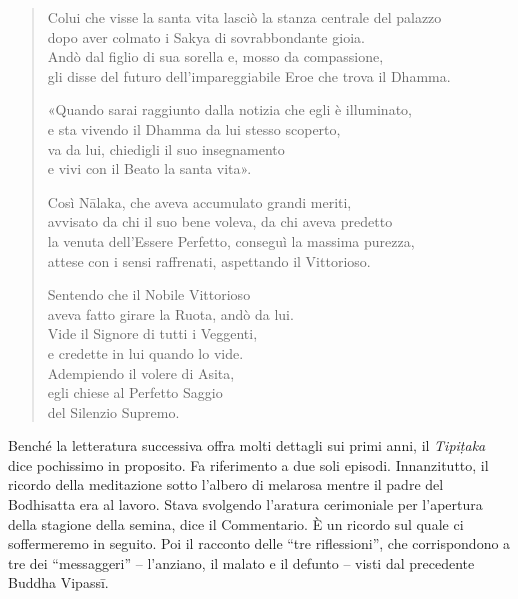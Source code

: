 \begin{quote}
Colui che visse la santa vita lasciò la stanza centrale del palazzo \\
dopo aver colmato i Sakya di sovrabbondante gioia. \\
Andò dal figlio di sua sorella e, mosso da compassione, \\
gli disse del futuro dell’impareggiabile Eroe che trova il Dhamma.


«Quando sarai raggiunto dalla notizia che egli è illuminato, \\
e sta vivendo il Dhamma da lui stesso scoperto, \\
va da lui, chiedigli il suo insegnamento \\
e vivi con il Beato la santa vita».


Così Nālaka, che aveva accumulato grandi meriti, \\
avvisato da chi il suo bene voleva, da chi aveva predetto \\
la venuta dell’Essere Perfetto, conseguì la massima purezza, \\
attese con i sensi raffrenati, aspettando il Vittorioso.


Sentendo che il Nobile Vittorioso \\
aveva fatto girare la Ruota, andò da lui. \\
Vide il Signore di tutti i Veggenti, \\
e credette in lui quando lo vide. \\
Adempiendo il volere di Asita, \\
egli chiese al Perfetto Saggio \\
del Silenzio Supremo.
\end{quote}



 Benché la letteratura successiva offra molti dettagli
sui primi anni, il \emph{Tipiṭaka} dice pochissimo in proposito. Fa
riferimento a due soli episodi. Innanzitutto, il ricordo della
meditazione sotto l’albero di melarosa mentre il padre del Bodhisatta
era al lavoro. Stava svolgendo l’aratura cerimoniale per l’apertura
della stagione della semina, dice il Commentario. È un ricordo sul quale
ci soffermeremo in seguito. Poi il racconto delle “tre riflessioni”, che
corrispondono a tre dei “messaggeri” – l’anziano, il malato e il defunto
– visti dal precedente Buddha Vipassī.




